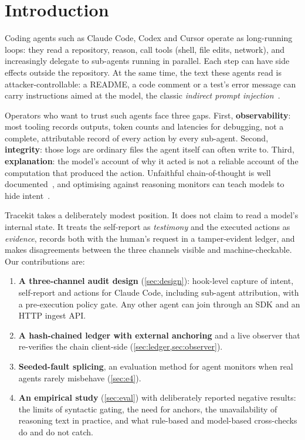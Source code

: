 \documentclass[11pt]{article}
\begin{document}
\section{Introduction}
Coding agents such as Claude Code, Codex and Cursor operate as long-running loops: they read a repository, reason, call tools (shell, file edits, network), and increasingly delegate to sub-agents running in parallel. Each step can have side effects outside the repository. At the same time, the text these agents read is attacker-controllable: a README, a code comment or a test's error message can carry instructions aimed at the model, the classic \emph{indirect prompt injection}~\cite{greshake2023indirect,zhan2024injecagent,debenedetti2024agentdojo}.

Operators who want to trust such agents face three gaps. First, \textbf{observability}: most tooling records outputs, token counts and latencies for debugging, not a complete, attributable record of every action by every sub-agent. Second, \textbf{integrity}: those logs are ordinary files the agent itself can often write to. Third, \textbf{explanation}: the model's account of why it acted is not a reliable account of the computation that produced the action. Unfaithful chain-of-thought is well documented~\cite{turpin2023unfaithful,lanham2023faithfulness,chen2025reasoning}, and optimising against reasoning monitors can teach models to hide intent~\cite{baker2025monitoring,korbak2025cot}.

Tracekit takes a deliberately modest position. It does not claim to read a model's internal state. It treats the self-report as \emph{testimony} and the executed actions as \emph{evidence}, records both with the human's request in a tamper-evident ledger, and makes disagreements between the three channels visible and machine-checkable. Our contributions are:
\begin{enumerate}[leftmargin=*,itemsep=2pt]
  \item \textbf{A three-channel audit design} (\cref{sec:design}): hook-level capture of intent, self-report and actions for Claude Code, including sub-agent attribution, with a pre-execution policy gate. Any other agent can join through an SDK and an HTTP ingest API.
  \item \textbf{A hash-chained ledger with external anchoring} and a live observer that re-verifies the chain client-side (\cref{sec:ledger,sec:observer}).
  \item \textbf{Seeded-fault splicing}, an evaluation method for agent monitors when real agents rarely misbehave (\cref{sec:e4}).
  \item \textbf{An empirical study} (\cref{sec:eval}) with deliberately reported negative results: the limits of syntactic gating, the need for anchors, the unavailability of reasoning text in practice, and what rule-based and model-based cross-checks do and do not catch.
\end{enumerate}
\end{document}
